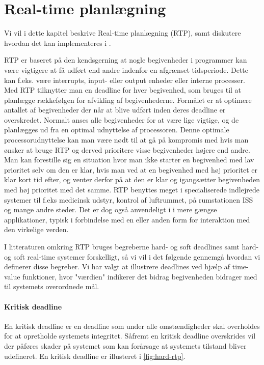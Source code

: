 \chapter{Real-time planlægning}
Vi vil i dette kapitel beskrive Real-time planlægning (RTP), samt diskutere hvordan det kan implementeres i \pycsp. 

RTP er baseret på den kendsgerning at nogle begivenheder i programmer kan være vigtigere at få udført end andre indenfor en afgrænset tidsperiode. Dette kan f.eks. være interrupts, input- eller output enheder eller interne processer. Med RTP tilknytter man en deadline for hver begivenhed, som bruges til at planlægge rækkefølgen for afvikling af begivenhederne. Formålet er at optimere antallet af begivenheder der når at blive udført inden deres deadline er overskredet. Normalt anses alle begivenheder for at være lige vigtige, og de planlægges ud fra en optimal udnyttelse af processoren. Denne optimale processorudnyttelse kan man være nødt til at gå på kompromis med hvis man ønsker at bruge RTP og derved prioritere visse begivenheder højere end andre. Man kan forestille sig en situation hvor man ikke starter en begivenhed med lav prioritet selv om den er klar, hvis man ved at en begivenhed med høj prioritet er klar kort tid efter, og venter derfor på at den er klar og igangsætter begivenheden med høj prioritet med det samme. 
RTP benyttes meget i specialiserede indlejrede systemer til f.eks medicinsk udstyr, kontrol af luftrummet, på rumstationen ISS\cite{Audsley1990} og mange andre steder. Det er dog også anvendeligt i i mere gængse applikationer, typisk i forbindelse med en eller anden form for interaktion med den virkelige verden. 

I litteraturen omkring RTP bruges begreberne hard- og soft deadlines samt hard- og soft real-time systemer forskelligt, så vi vil i det følgende gennemgå hvordan vi definerer disse begreber. Vi har valgt at illustrere deadlines ved hjælp af time-value funktioner, hvor "værdien" indikerer det bidrag begivenheden bidrager med til systemets overordnede mål. 

\subsubsection{Kritisk deadline}
En kritisk deadline er en deadline som under alle omstændigheder skal overholdes for at opretholde systemets integritet. Såfremt en kritisk deadline overskrides vil der påføres skader på systemet som kan forårsage at systemets tilstand bliver udefineret. En kritisk deadline er illusteret i \cref{fig:hard-rtp}.

